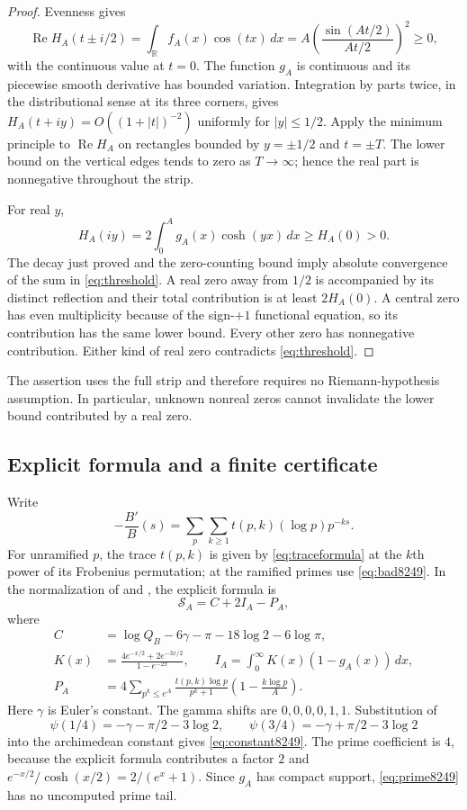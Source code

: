 \documentclass[11pt]{article}
\theoremstyle{definition}
\theoremstyle{remark}
\newcommand{\R}{\mathbb R}
\newcommand{\dd}{\,d}
\newcommand{\Rea}{\operatorname{Re}}
\numberwithin{equation}{section}
\begin{document}
\begin{proof}
Evenness gives
\[
\Rea H_A(t\pm i/2)=\int_\R f_A(x)\cos(tx)\dd x
=A\left(\frac{\sin(At/2)}{At/2}\right)^2\ge0,
\]
with the continuous value at $t=0$. The function $g_A$ is continuous and its piecewise smooth derivative has bounded variation. Integration by parts twice, in the distributional sense at its three corners, gives
$H_A(t+iy)=O((1+|t|)^{-2})$ uniformly for $|y|\le1/2$. Apply the minimum principle to $\Rea H_A$ on rectangles bounded by $y=\pm1/2$ and $t=\pm T$. The lower bound on the vertical edges tends to zero as $T\to\infty$; hence the real part is nonnegative throughout the strip.

For real $y$,
\[
H_A(iy)=2\int_0^A g_A(x)\cosh(yx)\dd x\ge H_A(0)>0.
\]
The decay just proved and the zero-counting bound imply absolute convergence of the sum in \eqref{eq:threshold}. A real zero away from $1/2$ is accompanied by its distinct reflection and their total contribution is at least $2H_A(0)$. A central zero has even multiplicity because of the sign-$+1$ functional equation, so its contribution has the same lower bound. Every other zero has nonnegative contribution. Either kind of real zero contradicts \eqref{eq:threshold}.
\end{proof}

The assertion uses the full strip and therefore requires no Riemann-hypothesis assumption. In particular, unknown nonreal zeros cannot invalidate the lower bound contributed by a real zero.

\subsection{Explicit formula and a finite certificate}

Write
\[
-\frac{B'}B(s)=\sum_p\sum_{k\ge1}t(p,k)(\log p)p^{-ks}.
\]
For unramified $p$, the trace $t(p,k)$ is given by \eqref{eq:traceformula} at the $k$th power of its Frobenius permutation; at the ramified primes use \eqref{eq:bad8249}. In the normalization of \citet[Section 3, equation (3--1)]{booker2006} and \citet[Definition 1.3 and Examples 1.4]{booker2015}, the explicit formula is
\begin{equation}\label{eq:EF8249}
\mathcal S_A=C+2I_A-P_A,
\end{equation}
where
\begin{align}
 C&=\log Q_B-6\gamma-\pi-18\log2-6\log\pi,\label{eq:constant8249}\\
 K(x)&=\frac{4e^{-x/2}+2e^{-3x/2}}{1-e^{-2x}},\qquad
 I_A=\int_0^\infty K(x)(1-g_A(x))\dd x,\label{eq:gamma8249}\\
 P_A&=4\sum_{p^k\le e^A}\frac{t(p,k)\log p}{p^k+1}
 \left(1-\frac{k\log p}{A}\right).\label{eq:prime8249}
\end{align}
Here $\gamma$ is Euler's constant. The gamma shifts are $0,0,0,0,1,1$. Substitution of
\[
\psi(1/4)=-\gamma-\pi/2-3\log2,\qquad
\psi(3/4)=-\gamma+\pi/2-3\log2
\]
into the archimedean constant gives \eqref{eq:constant8249}. The prime coefficient is $4$, because the explicit formula contributes a factor $2$ and
$e^{-x/2}/\cosh(x/2)=2/(e^x+1)$. Since $g_A$ has compact support, \eqref{eq:prime8249} has no uncomputed prime tail.
\end{document}
